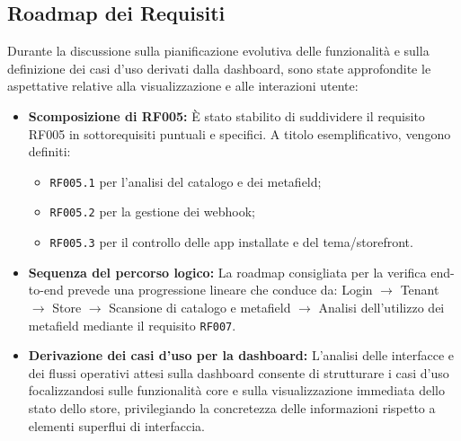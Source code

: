 \subsection{Roadmap dei Requisiti}
Durante la discussione sulla pianificazione evolutiva delle funzionalità e sulla definizione dei casi d'uso derivati dalla dashboard, sono state approfondite le aspettative relative alla visualizzazione e alle interazioni utente:
\begin{itemize}
    \item \textbf{Scomposizione di RF005:} È stato stabilito di suddividere il requisito RF005 in sottorequisiti puntuali e specifici. A titolo esemplificativo, vengono definiti:
    \begin{itemize}
        \item \texttt{RF005.1} per l'analisi del catalogo e dei metafield;
        \item \texttt{RF005.2} per la gestione dei webhook;
        \item \texttt{RF005.3} per il controllo delle app installate e del tema/storefront.
    \end{itemize}
    \item \textbf{Sequenza del percorso logico:} La roadmap consigliata per la verifica end-to-end prevede una progressione lineare che conduce da: Login $\rightarrow$ Tenant $\rightarrow$ Store $\rightarrow$ Scansione di catalogo e metafield $\rightarrow$ Analisi dell'utilizzo dei metafield mediante il requisito \texttt{RF007}.
    \item \textbf{Derivazione dei casi d'uso per la dashboard:} L'analisi delle interfacce e dei flussi operativi attesi sulla dashboard consente di strutturare i casi d'uso focalizzandosi sulle funzionalità core e sulla visualizzazione immediata dello stato dello store, privilegiando la concretezza delle informazioni rispetto a elementi superflui di interfaccia.
\end{itemize}
